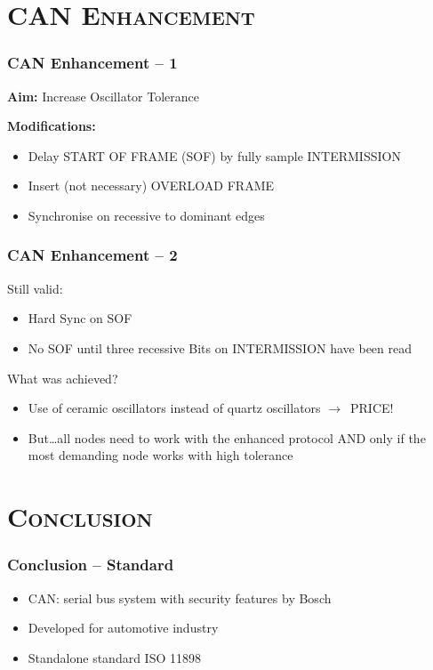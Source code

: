 \documentclass[xcolor=x11names,compress]{beamer}
\renewcommand{\(}{\begin{columns}}
\renewcommand{\)}{\end{columns}}
\newcommand{\<}[1]{\begin{column}{#1}}
\renewcommand{\>}{\end{column}}
\begin{document}
\section{\scshape CAN Enhancement}
\begin{frame}
  \frametitle{CAN Enhancement -- 1}

\textbf{Aim:} Increase Oscillator Tolerance
\vspace{0.3cm}

\textbf{Modifications:}
\begin{itemize}
    \item Delay START OF FRAME (SOF) by fully sample INTERMISSION
    \item Insert (not necessary) OVERLOAD FRAME
    \item Synchronise on recessive to dominant edges
\end{itemize}

\end{frame}

\begin{frame}
  \frametitle{CAN Enhancement -- 2}
Still valid:
\begin{itemize}
    \item Hard Sync on SOF 
    \item No SOF until three recessive Bits on INTERMISSION have been read
\end{itemize}

What was achieved?
\begin{itemize}
  \item Use of ceramic oscillators instead of quartz oscillators $\rightarrow$~PRICE!
  \item But\ldots all nodes need to work with the enhanced protocol AND only if the most demanding node works with high tolerance
\end{itemize}

\end{frame}

\section{\scshape Conclusion}

\begin{frame}
  \frametitle{Conclusion -- Standard}

\begin{itemize}
 \item CAN: serial bus system with security features by Bosch
 \item Developed for automotive industry
 \item Standalone standard ISO 11898
\end{itemize}

\end{frame}
\end{document}
